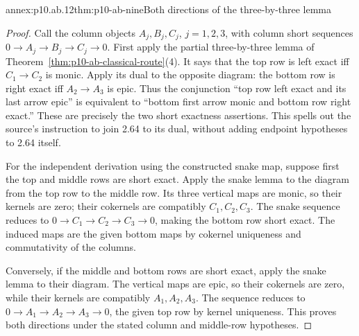 \begin{annexitem}{annex:p10.ab.12}{thm:p10-ab-nine}{Both directions of the three-by-three lemma}
\begin{proof}
Call the column objects \(A_j,B_j,C_j\), \(j=1,2,3\), with
column short sequences \(0\to A_j\to B_j\to C_j\to0\).
First apply the partial three-by-three lemma of
Theorem~\ref{thm:p10-ab-classical-route}(4). It says that the top
row is left exact iff \(C_1\to C_2\) is monic. Apply its dual
to the opposite diagram: the bottom row is right exact iff
\(A_2\to A_3\) is epic. Thus the conjunction ``top row left
exact and its last arrow epic'' is equivalent to ``bottom first arrow
monic and bottom row right exact.'' These are precisely the two short
exactness assertions. This spells out the source's instruction to join
2.64 to its dual, without adding endpoint hypotheses to 2.64 itself.

For the independent derivation using the constructed snake map, suppose first the top and middle rows are short exact. Apply the snake
lemma to the diagram from the top row to the middle row. Its three
vertical maps are monic, so their kernels are zero; their cokernels
are compatibly \(C_1,C_2,C_3\). The snake sequence reduces to
\(0\to C_1\to C_2\to C_3\to0\), making the bottom row short
exact. The induced maps are the given bottom maps by cokernel
uniqueness and commutativity of the columns.

Conversely, if the middle and bottom rows are short exact, apply the
snake lemma to their diagram. The vertical maps are epic, so their
cokernels are zero, while their kernels are compatibly \(A_1,A_2,A_3\).
The sequence reduces to \(0\to A_1\to A_2\to A_3\to0\), the
given top row by kernel uniqueness. This proves both directions under
the stated column and middle-row hypotheses.
\end{proof}
\end{annexitem}

